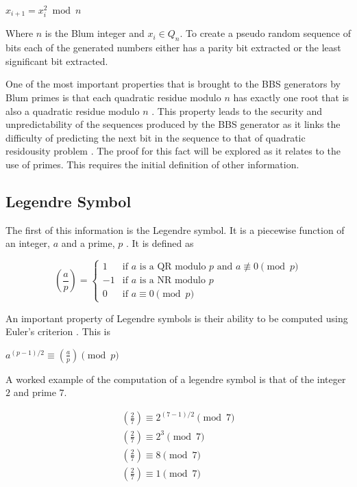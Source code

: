 \documentclass{article}
\begin{document}
$x_{i+1} = x_i^2 \bmod n$

Where $n$ is the Blum integer and $x_i \in Q_n$. To create a pseudo random sequence of bits each of the generated numbers either has a parity bit extracted or the least significant bit extracted.

One of the most important properties that is brought to the BBS generators by Blum primes is that each quadratic residue modulo $n$ has exactly one root that is also a quadratic residue modulo $n$ \cite{Blum1986}. This property leads to the security and unpredictability of the sequences produced by the BBS generator as it links the difficulty of predicting the next bit in the sequence to that of quadratic residousity problem \cite{Blum1986}. The proof for this fact will be explored as it relates to the use of primes. This requires the initial definition of other information.

\subsection{Legendre Symbol}

The first of this information is the Legendre symbol. It is a piecewise function of an integer, $a$ and a prime, $p$ \cite{Silverman2006}. It is defined as

$$
\left(\frac{a}{p}\right) = \left\{
                        \begin{array}{cl}  
                            1 & \mbox{if $a$ is a QR modulo $p$ and } a \not\equiv 0 \pmod{p} \\
                            -1 & \mbox{if $a$ is a NR modulo $p$} \\
                            0 & \mbox{if } a \equiv 0 \pmod{p}
                        \end{array}
                    \right.
$$

An important property of Legendre symbols is their ability to be computed using Euler's criterion  \cite{Silverman2006}. This is

$a^{(p-1)/2} \equiv \left(\frac{a}{p}\right) \pmod{p}$

A worked example of the computation of a legendre symbol is that of the integer $2$ and prime $7$.

$$
\begin{array}{l}
\left(\frac{2}{7}\right) \equiv 2^{(7-1)/2} \pmod{7} \\
\left(\frac{2}{7}\right) \equiv 2^3 \pmod{7} \\
\left(\frac{2}{7}\right) \equiv 8 \pmod{7} \\
\left(\frac{2}{7}\right) \equiv 1 \pmod{7} 
\end{array}
$$
\end{document}
